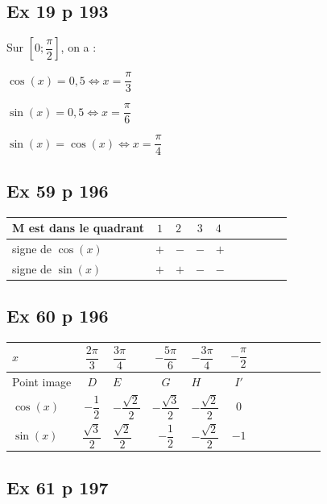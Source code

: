 \documentclass[a4paper,french]{book}
\begin{document}
\subsection*{Ex 19 p 193}
Sur $\left[0;\dfrac{\pi}{2}\right]$, on a :
\begin{enumMet}
    \item $\cos(x)=0,5\iff x=\dfrac{\pi}{3}$
    \item $\sin(x)=0,5\iff x=\dfrac{\pi}{6}$
    \item $\sin(x)=\cos(x)\iff x=\dfrac{\pi}{4}$
\end{enumMet}

\subsection*{Ex 59 p 196}

\begin{tabular}{ | Xc | Xc | Xc | Xc | Xc |}
    \hline
    M est dans le quadrant & $1$ & $2$ & $3$ & $4$ \\ \hline
    signe de $\cos(x)$  & $+$ & $-$ & $-$ & $+$ \\ \hline
    signe de $\sin(x)$ & $+$ & $+$ & $-$ & $-$ \\
    \hline  
\end{tabular}

\subsection*{Ex 60 p 196}

\begin{tabular}{ | Xc | Xc | Xc | Xc | Xc | Xc |}
    \hline
    $x$  & $\dfrac{2\pi}{3}$ & $\dfrac{3\pi}{4}$ & $-\dfrac{5\pi}{6}$ & $-\dfrac{3\pi}{4}$ & $-\dfrac{\pi}{2}$ \\ \hline
    Point image  & $D$ & $E$ & $G$ & $H$ & $I'$ \\ \hline
    $\cos(x)$  & $-\dfrac{1}{2}$ & $-\dfrac{\sqrt{2}}{2}$ & $-\dfrac{\sqrt{3}}{2}$ & $-\dfrac{\sqrt{2}}{2}$ & $0$ \\ \hline
    $\sin(x)$ & $\dfrac{\sqrt{3}}{2}$ & $\dfrac{\sqrt{2}}{2}$ & $-\dfrac{1}{2}$ & $-\dfrac{\sqrt{2}}{2}$ & $-1$ \\
    \hline  
\end{tabular}

\subsection*{Ex 61 p 197}
\end{document}
